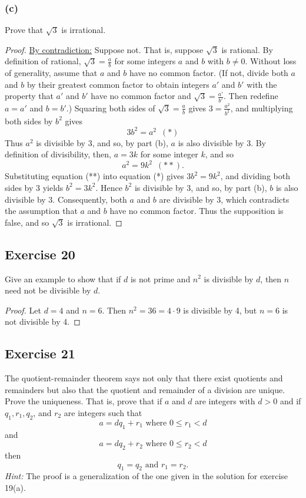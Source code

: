 \documentclass[14pt]{extarticle}
\begin{document}
\subsubsection{(c)}
Prove that $\sqrt{3}$ is irrational.

\begin{proof}
\underline{By contradiction:} Suppose not. That is,
suppose $\sqrt{3}$ is rational. By definition of rational,
$\sqrt{3} = \frac{a}{b}$ for some integers $a$ and $b$ with $b \neq 0$. Without loss of generality, assume that $a$ and $b$ have no common factor. (If not, divide both $a$ and $b$ by their greatest common factor to obtain integers $a'$ and $b'$ with the property that $a'$ and $b'$ have no common factor and $\sqrt{3} = \frac{a'}{b'}$. Then redefine $a = a'$ and $b = b'$.) Squaring both sides of $\sqrt{3} = \frac{a}{b}$ gives $3 = \frac{a^2}{b^2}$, and multiplying both sides by $b^2$ gives 
\[
3b^2 = a^2 \,\,\,(*)
\]
Thus $a^2$ is divisible by 3, and so, by part (b), $a$ is also divisible by 3. By definition of divisibility, then, $a = 3k$ for some integer $k$, and so 
\[
a^2 = 9k^2 \,\,\,(**).
\] 
Substituting equation (**) into equation (*) gives $3b^2 = 9k^2$, and dividing both sides by 3 yields $b^2 = 3k^2$. Hence $b^2$ is divisible by 3, and so, by part (b), $b$ is also divisible by 3. Consequently, both $a$ and $b$ are divisible by 3, which contradicts the assumption that $a$ and $b$ have no common factor. Thus the supposition is false, and so $\sqrt{3}$ is irrational.
\end{proof}

\subsection{Exercise 20}
Give an example to show that if $d$ is not prime and $n^2$ is divisible by $d$, then $n$ need not be divisible by $d$.

\begin{proof}
Let $d = 4$ and $n = 6$. Then $n^2 = 36 = 4 \cdot 9$ is divisible by 4, but $n = 6$ is not divisible by 4.
\end{proof}

\subsection{Exercise 21}
The quotient-remainder theorem says not only that there exist quotients and remainders but also that the quotient and remainder of a division are unique. Prove the uniqueness. That is, prove that if $a$ and $d$ are integers with $d > 0$ and if $q_1, r_1, q_2$, and $r_2$ are integers such that
\[
a = dq_1 + r_1 \text{ where } 0 \leq r_1 < d
\]
and
\[
a = dq_2 + r_2 \text{ where } 0 \leq r_2 < d
\]
then
\[
q_1 = q_2 \text{ and } r_1 = r_2.
\]
{\it Hint:} The proof is a generalization of the one given in the solution for exercise 19(a).
\end{document}
